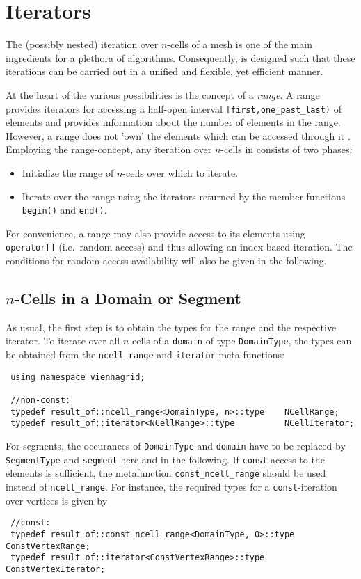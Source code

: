 \chapter{Iterators} \label{chap:iterators}
The (possibly nested) iteration over $n$-cells of a mesh is one of the main ingredients for a plethora of algorithms.
Consequently, {\ViennaGrid} is designed such that these iterations can be carried out in a unified and flexible, yet efficient manner.

At the heart of the various possibilities is the concept of a \emph{range}. A range provides iterators for accessing a half-open interval \texttt{[first,one\_past\_last)} of elements and provides information about the number of elements in the range. However, a range does not 'own' the elements which can be accessed through it \cite{boost}. 
Employing the range-concept, any iteration over $n$-cells in {\ViennaGrid} consists of two phases:
\begin{itemize}
 \item Initialize the range of $n$-cells over which to iterate.
 \item Iterate over the range using the iterators returned by the member functions \lstinline|begin()| and \lstinline|end()|.
\end{itemize}

For convenience, a range may also provide access to its elements using \lstinline|operator[]| (i.e.~random access) and thus allowing an index-based iteration. The conditions for random access availability will also be given in the following.


\section{$n$-Cells in a Domain or Segment}
As usual, the first step is to obtain the types for the range and the respective iterator.
To iterate over all $n$-cells of a \lstinline|domain| of type \lstinline|DomainType|, the types can be obtained from the \lstinline|ncell_range| and \lstinline|iterator| meta-functions:
\begin{lstlisting}
 using namespace viennagrid;

 //non-const:
 typedef result_of::ncell_range<DomainType, n>::type    NCellRange;
 typedef result_of::iterator<NCellRange>::type          NCellIterator;
\end{lstlisting}
For segments, the occurances of \lstinline|DomainType| and \lstinline|domain| have to be replaced by \lstinline|SegmentType| and \lstinline|segment| here and in the following.
If \lstinline|const|-access to the elements is sufficient, the metafunction \lstinline|const_ncell_range| should be used instead of \lstinline|ncell_range|.
For instance, the required types for a \lstinline|const|-iteration over vertices is given by
\begin{lstlisting}
 //const:
 typedef result_of::const_ncell_range<DomainType, 0>::type   ConstVertexRange;
 typedef result_of::iterator<ConstVertexRange>::type         ConstVertexIterator;
\end{lstlisting}

